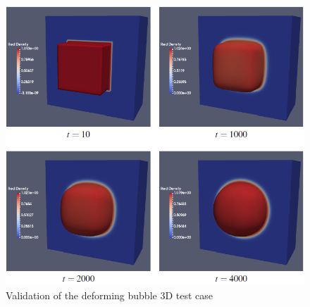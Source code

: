\documentclass[12pt, openany]{book}
\begin{document}
    \begin{figure}[H]
    	\centering
    	\includegraphics[width=\linewidth]{Resources/Images/AntonioValid/DeformingBubble3D.PNG}
    	\caption{Validation of the deforming bubble 3D test case}
    	\label{fig:deform3D}
    \end{figure}
    
\end{document}
